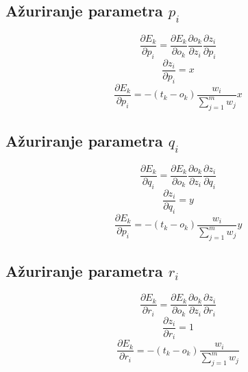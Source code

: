 \documentclass{article}
\begin{document}
\subsection{Ažuriranje parametra $ p_i $}

\begin{equation}
    \frac{\partial E_k}{\partial p_i} =
    \frac{\partial E_k}{\partial o_k} \frac{\partial o_k}{\partial z_i} \frac{\partial z_i}{\partial p_i}
\end{equation}
\begin{equation}
    \frac{\partial z_i}{\partial p_i} =
    x
\end{equation}
\begin{equation}
    \frac{\partial E_k}{\partial p_i} =
    - (t_k - o_k) \frac{w_i}{\sum_{j = 1}^{m}{w_j}} x
\end{equation}

\subsection{Ažuriranje parametra $ q_i $}

\begin{equation}
    \frac{\partial E_k}{\partial q_i} =
    \frac{\partial E_k}{\partial o_k} \frac{\partial o_k}{\partial z_i} \frac{\partial z_i}{\partial q_i}
\end{equation}
\begin{equation}
    \frac{\partial z_i}{\partial q_i} =
    y
\end{equation}
\begin{equation}
    \frac{\partial E_k}{\partial p_i} =
    - (t_k - o_k) \frac{w_i}{\sum_{j = 1}^{m}{w_j}} y
\end{equation}

\subsection{Ažuriranje parametra $ r_i $}

\begin{equation}
    \frac{\partial E_k}{\partial r_i} =
    \frac{\partial E_k}{\partial o_k} \frac{\partial o_k}{\partial z_i} \frac{\partial z_i}{\partial r_i}
\end{equation}
\begin{equation}
    \frac{\partial z_i}{\partial r_i} =
    1
\end{equation}
\begin{equation}
    \frac{\partial E_k}{\partial r_i} =
    - (t_k - o_k) \frac{w_i}{\sum_{j = 1}^{m}{w_j}}
\end{equation}
\end{document}
